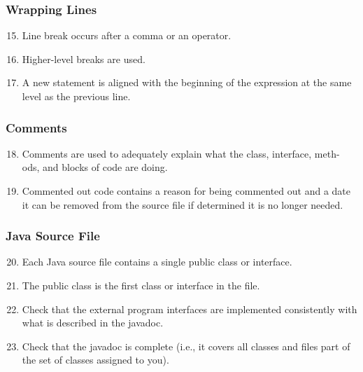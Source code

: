 \subsubsection{Wrapping Lines} \label{sssec:wrap}

\begin{enumerate}
\setcounter{enumi}{14}

\item Line break occurs after a comma or an operator.

\item Higher-level breaks are used.

\item A new statement is aligned with the beginning of the expression at the same level as the previous line.

\end{enumerate}

\subsubsection{Comments} \label{sssec:comm}

\begin{enumerate}
\setcounter{enumi}{17}

\item Comments are used to adequately explain what the class, interface, meth- ods, and blocks of code are doing.

\item Commented out code contains a reason for being commented out and a date it can be removed from the source file if determined it is no longer needed.

\end{enumerate}

\subsubsection{Java Source File} \label{sssec:source}

\begin{enumerate}
\setcounter{enumi}{19}

\item Each Java source file contains a single public class or interface.

\item The public class is the first class or interface in the file.

\item Check that the external program interfaces are implemented consistently with what is described in the javadoc.

\item Check that the javadoc is complete (i.e., it covers all classes and files part of the set of classes assigned to you).

\end{enumerate}


